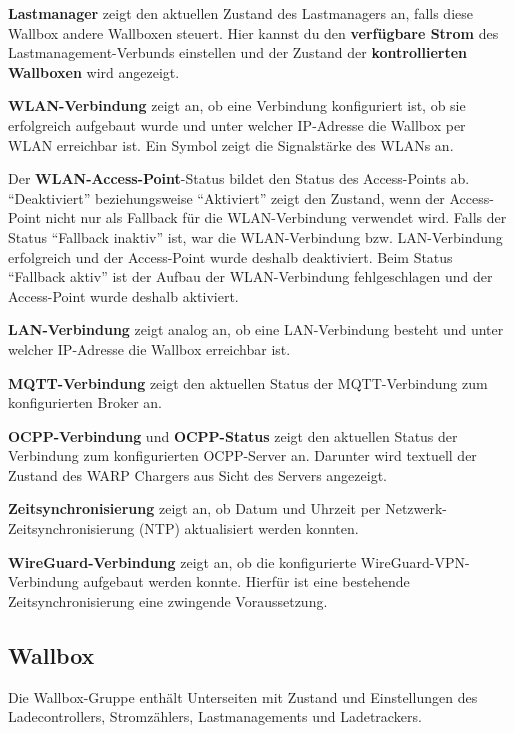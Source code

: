 \documentclass[a4paper,10pt]{article}
\begin{document}
\begin{multicols*}{2}
	\textbf{Lastmanager} zeigt den aktuellen Zustand des Lastmanagers an, falls diese Wallbox
	andere Wallboxen steuert. Hier kannst du den \textbf{verfügbare Strom} des Lastmanagement-Verbunds
	einstellen und der Zustand der \textbf{kontrollierten Wallboxen} wird angezeigt.

	\textbf{WLAN-Verbindung} zeigt an, ob eine Verbindung konfiguriert ist, ob sie erfolgreich aufgebaut wurde und
	unter welcher IP-Adresse die Wallbox per WLAN erreichbar ist. Ein Symbol
	zeigt die Signalstärke des WLANs an.

	Der \textbf{WLAN-Access-Point}-Status bildet den Status des Access-Points ab.
	\enquote{Deaktiviert} beziehungsweise \enquote{Aktiviert} zeigt den Zustand, wenn der Access-Point nicht
	nur als Fallback für die WLAN-Verbindung verwendet wird. Falls der Status \enquote{Fallback inaktiv} ist,
	war die WLAN-Verbindung bzw. LAN-Verbindung erfolgreich und der Access-Point wurde deshalb deaktiviert.
	Beim Status \enquote{Fallback aktiv} ist der Aufbau der WLAN-Verbindung fehlgeschlagen und der
	Access-Point wurde deshalb aktiviert.
	
	\textbf{LAN-Verbindung} zeigt analog an, ob eine LAN-Verbindung besteht und unter welcher IP-Adresse die Wallbox erreichbar ist.

	\textbf{MQTT-Verbindung} zeigt den aktuellen Status der MQTT-Verbindung
	zum konfigurierten Broker an.

	\textbf{OCPP-Verbindung} und \textbf{OCPP-Status} zeigt den aktuellen Status der Verbindung zum konfigurierten OCPP-Server an.
	Darunter wird textuell der Zustand des WARP Chargers aus Sicht des Servers angezeigt.

	\textbf{Zeitsynchronisierung} zeigt an, ob Datum und Uhrzeit per Netzwerk-Zeitsynchronisierung (NTP) aktualisiert werden konnten.

	\textbf{WireGuard-Verbindung} zeigt an, ob die konfigurierte WireGuard-VPN-Verbindung aufgebaut werden konnte. Hierfür ist eine bestehende Zeitsynchronisierung eine zwingende Voraussetzung.



	\vfill
	\null

	\columnbreak

	\subsection{Wallbox}
	Die Wallbox-Gruppe enthält Unterseiten mit Zustand und Einstellungen des Ladecontrollers, Stromzählers, Lastmanagements und Ladetrackers.


\end{multicols*}
\end{document}
